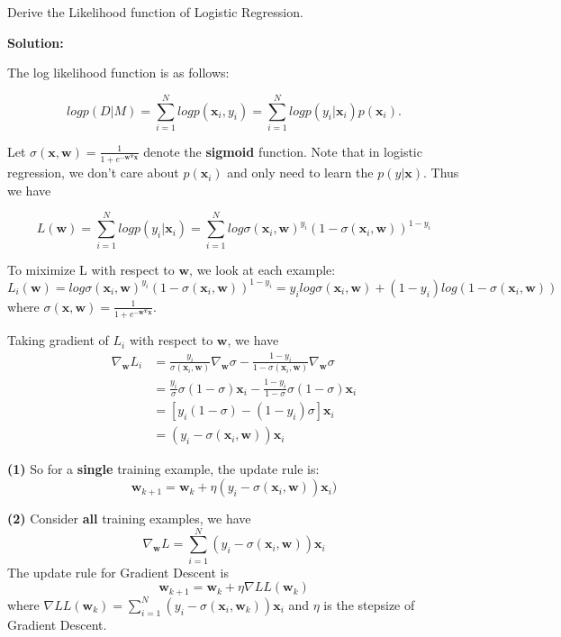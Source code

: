 \documentclass[11pt]{article}
\begin{document}
Derive the Likelihood function of Logistic Regression.

\textbf{Solution:} 

The log likelihood function is as follows:

$$logp(D|M) = \sum_{i = 1}^N logp(\bm{x}_i,y_i) = \sum_{i = 1}^N logp(y_i|\bm{x}_i)p(\bm{x}_i).$$

Let $\sigma(\bm{x}, \bm{w}) = \frac{1}{1+e^{-\bm{w^Tx}}}$ denote the \textbf{sigmoid} function. Note that in logistic regression, we don't care about $p(\bm{x}_i)$ and only need to learn the $p(y|\bm{x})$. Thus we have

$$L(\bm{w}) = \sum_{i = 1}^N logp(y_i|\bm{x}_i) = \sum_{i = 1}^N log \sigma(\bm{x}_i, \bm{w})^{y_i}(1-\sigma(\bm{x}_i, \bm{w}))^{1-y_i}$$

To miximize L with respect to $\bm{w}$, we look at each example:
$$L_i(\bm{w}) = log \sigma(\bm{x}_i, \bm{w})^{y_i}(1-\sigma(\bm{x}_i, \bm{w}))^{1-y_i} = y_ilog\sigma(\bm{x}_i, \bm{w})+(1-y_i)log(1-\sigma(\bm{x}_i, \bm{w}))$$
where $\sigma(\bm{x}, \bm{w}) = \frac{1}{1+e^{-\bm{w^Tx}}}$.

\vspace{5 mm}

Taking gradient of $L_i$ with respect to $\bm{w}$, we have
\begin{align*}
\nabla_{\bm{w}}L_i &= \frac{y_i}{\sigma(\bm{x}_i, \bm{w})}\nabla_{\bm{w}}\sigma-\frac{1-y_i}{1-\sigma(\bm{x}_i, \bm{w})}\nabla_{\bm{w}}\sigma \\
&= \frac{y_i}{\sigma}\sigma(1-\sigma)\bm{x}_i-\frac{1-y_i}{1-\sigma}\sigma(1-\sigma)\bm{x}_i\\
&=[y_i(1-\sigma)-(1-y_i)\sigma]\bm{x}_i\\
&=(y_i-\sigma(\bm{x}_i,\bm{w}))\bm{x}_i
\end{align*}

\textbf{(1)} So for a \textbf{single} training example, the update rule is:
$$\bm{w}_{k+1} = \bm{w}_{k} + \eta(y_i-\sigma(\bm{x}_i,\bm{w}))\bm{x}_i)$$

\textbf{(2)} Consider \textbf{all} training examples, we have
$$\nabla_{\bm{w}}L =\sum_{i=1}^N(y_i-\sigma(\bm{x}_i,\bm{w}))\bm{x}_i$$
The update rule for Gradient Descent is $$\bm{w}_{k+1} = \bm{w}_{k} + \eta\nabla LL(\bm{w}_k)$$
where $\nabla LL(\bm{w}_k) = \sum_{i=1}^N(y_i-\sigma(\bm{x}_i,\bm{w}_k))\bm{x}_i$ and $\eta$ is the stepsize of Gradient Descent.
\end{document}
